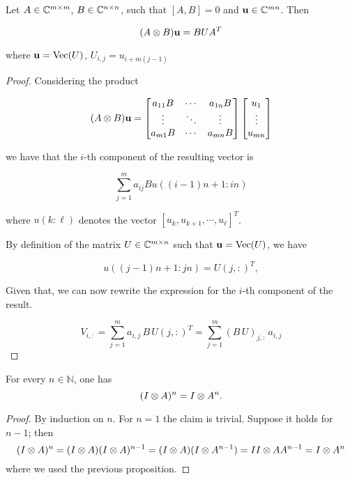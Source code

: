 \begin{proposition}
    Let $A \in \mathbb{C}^{m \times m}$, $B \in \mathbb{C}^{n \times n}$, such that $[A,B] = 0$ and $\mathbf{u} \in \mathbb{C}^{mn}$. Then 

    \[(A \otimes B)\mathbf{u} = BUA^T\]

    where $\mathbf{u} = \mathrm{Vec}(U)$, $U_{i,j} =  u_{i + m(j - 1)}$ 

    \label{prop:tensorprod}
\end{proposition}

\begin{proof}
    Considering the product 

    \[
        (A \otimes B)\mathbf{u} = 
        \begin{bmatrix}
            a_{11}B & \cdots & a_{1n}B \\
            \vdots & \ddots & \vdots \\
            a_{m1}B & \cdots & a_{mn}B
        \end{bmatrix}
        \begin{bmatrix}
            u_1 \\
            \vdots \\
            u_{mn}
        \end{bmatrix}
    \]

    we have that the $i$-th component of the resulting vector is 

    \[\sum_{j = 1}^{m}a_{ij}Bu((i - 1)n + 1:in)\]

    where $u(k:\ell)$ denotes the vector $\left[u_k, u_{k+1}, \cdots, u_{\ell}\right]^T$.

    By definition of the matrix $U \in \mathbb{C}^{m \times n}$ such that $\mathbf{u} = \mathrm{Vec}(U)$, we have

    \[
        u((j-1)n + 1 : j n) = U(j,:) ^T,
    \]

    Given that, we can now rewrite the expression for the $i$-th component of the result.

    \[
        V_{i,:} = \sum_{j = 1}^m a_{i,j} \, B \, U(j,:)^T = \sum_{j = 1}^m (B \, U)_{j,:} \, a_{i,j} 
    \]

\end{proof}

\begin{lemma}
    For every $n \in \mathbb{N}$, one has
    \[
        (I \otimes A)^n = I \otimes A^n.
    \]
\end{lemma}

\begin{proof}
    By induction on $n$. For $n=1$ the claim is trivial. Suppose it holds for $n-1$; then
    \[
        (I \otimes A)^{n} = (I \otimes A)(I \otimes A)^{n-1} =(I \otimes A)(I \otimes A^{n-1}) = II \otimes AA^{n-1} = I \otimes A^{n}
    \]
    where we used the previous proposition.
\end{proof}

